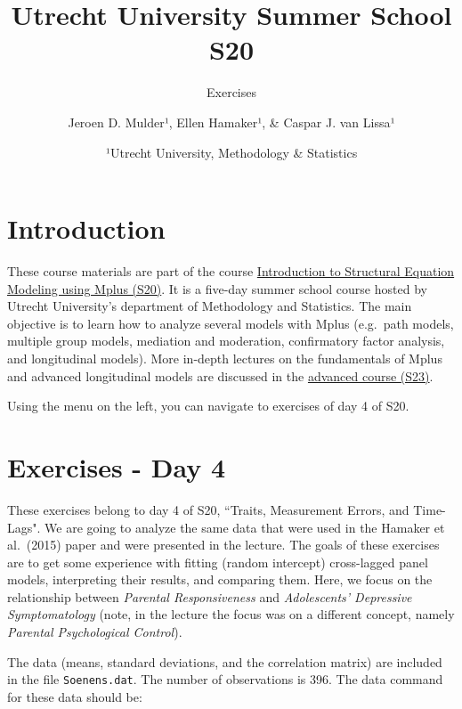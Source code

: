 \documentclass[
]{book}
\title{Utrecht University Summer School S20}
\subtitle{Exercises}
\author{Jeroen D. Mulder¹, Ellen Hamaker¹, \& Caspar J. van Lissa¹}
\date{¹Utrecht University, Methodology \& Statistics}
\begin{document}
\maketitle

{
\setcounter{tocdepth}{1}
\tableofcontents
}
\hypertarget{introduction}{%
\chapter*{Introduction}\label{introduction}}

These course materials are part of the course \href{https://utrechtsummerschool.nl/courses/social-sciences/introduction-to-structural-equation-modeling-using-mplus}{Introduction to Structural Equation Modeling using Mplus (S20)}. It is a five-day summer school course hosted by Utrecht University's department of Methodology and Statistics. The main objective is to learn how to analyze several models with Mplus (e.g.~path models, multiple group models, mediation and moderation, confirmatory factor analysis, and longitudinal models). More in-depth lectures on the fundamentals of Mplus and advanced longitudinal models are discussed in the \href{https://utrechtsummerschool.nl/courses/social-sciences/advanced-course-on-using-mplus}{advanced course (S23)}.

Using the menu on the left, you can navigate to exercises of day 4 of S20.

\hypertarget{exercises---day-4}{%
\chapter*{Exercises - Day 4}\label{exercises---day-4}}

These exercises belong to day 4 of S20, ``Traits, Measurement Errors, and Time-Lags". We are going to analyze the same data that were used in the Hamaker et al.~(2015) paper and were presented in the lecture. The goals of these exercises are to get some experience with fitting (random intercept) cross-lagged panel models, interpreting their results, and comparing them. Here, we focus on the relationship between \emph{Parental Responsiveness} and \emph{Adolescents' Depressive Symptomatology} (note, in the lecture the focus was on a different concept, namely \emph{Parental Psychological Control}).

The data (means, standard deviations, and the correlation matrix) are included in the file \texttt{Soenens.dat}. The number of observations is 396. The data command for these data should be:
\end{document}
